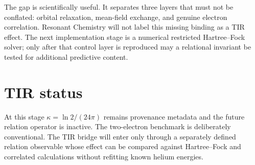 The gap is scientifically useful. It separates three layers that must not be conflated: orbital relaxation, mean-field exchange, and genuine electron correlation. Resonant Chemistry will not label this missing binding as a TIR effect. The next implementation stage is a numerical restricted Hartree--Fock solver; only after that control layer is reproduced may a relational invariant be tested for additional predictive content.

\section{TIR status}
At this stage $\kappa=\ln 2/(24\pi)$ remains provenance metadata and the future relation operator is inactive. The two-electron benchmark is deliberately conventional. The TIR bridge will enter only through a separately defined relation observable whose effect can be compared against Hartree--Fock and correlated calculations without refitting known helium energies.
